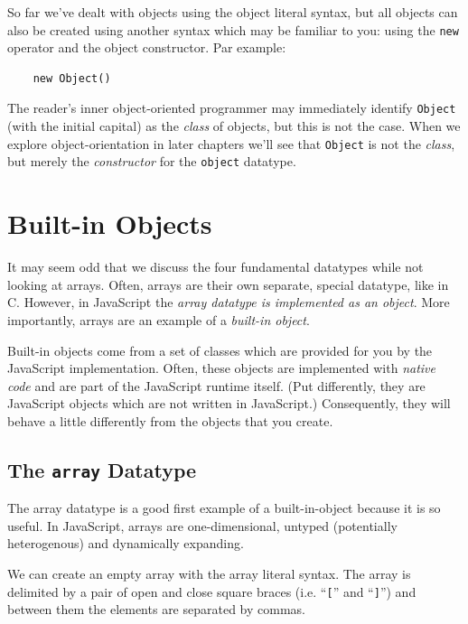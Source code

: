 \documentclass[11pt,letter]{book}
\begin{document}
    So far we've dealt with objects using the object literal syntax, but all objects can also be 
    created using another syntax which may be familiar to you: using the \texttt{new} operator and 
    the object constructor. Par example:
    
    \begin{verbatim}
    new Object()
    \end{verbatim}
    
    The reader's inner object-oriented programmer may immediately identify \texttt{Object} (with the 
    initial capital) as the \emph{class} of objects, but this is not the case. When we explore 
    object-orientation in later chapters we'll see that \texttt{Object} is not the \emph{class}, but 
    merely the \emph{constructor} for the \texttt{object} datatype.
    
    \section{Built-in Objects}
    It may seem odd that we discuss the four fundamental datatypes while not looking at arrays.
    Often, arrays are their own separate, special datatype, like in C. However, in JavaScript the 
    \emph{array datatype is implemented as an object}. More importantly, arrays are an example of a
    \emph{built-in object}.
    
    Built-in objects come from a set of classes which are provided for you by the JavaScript 
    implementation. Often, these objects are implemented with \emph{native code} and are part of 
    the JavaScript runtime itself. (Put differently, they are JavaScript objects which are not 
    written in JavaScript.) Consequently, they will behave a little differently from the objects 
    that you create.
    
    \subsection{The \texttt{array} Datatype}
    
    The array datatype is a good first example of a built-in-object because it is so useful. In 
    JavaScript, arrays are one-dimensional, untyped (potentially heterogenous) and dynamically 
    expanding. 
    
    We can create an empty array with the array literal syntax. The array is delimited by a pair of 
    open and close square braces (i.e. ``\texttt{[}'' and ``\texttt{]}'') and between them the 
    elements are separated by commas.
    
\end{document}
